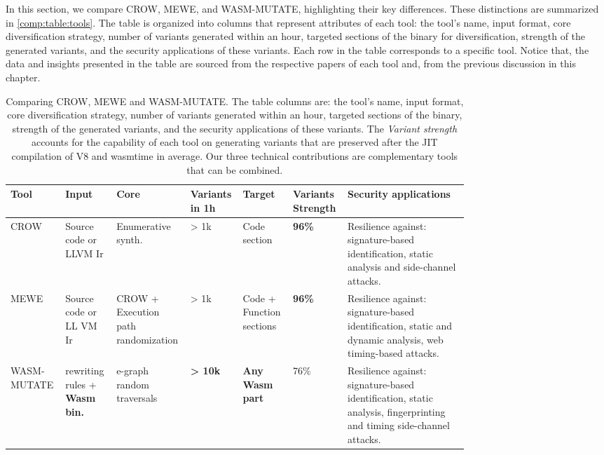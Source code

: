 

In this section, we compare CROW, MEWE, and WASM-MUTATE, highlighting their key differences. 
These distinctions are summarized in \autoref{comp:table:tools}. 
The table is organized into columns that represent attributes of each tool: the tool's name, input format, core diversification strategy, number of variants generated within an hour, targeted sections of the \Wasm binary for diversification, strength of the generated variants, and the security applications of these variants. 
Each row in the table corresponds to a specific tool. 
Notice that, the data and insights presented in the table are sourced from the respective papers of each tool and, from the previous discussion in this chapter.


\begin{landscape}
    
    \begin{table}
        \begin{tabular}{p{0.08\linewidth} | p{0.1\linewidth} | p{0.1\linewidth
            } | p{0.06\linewidth} | p{0.1\linewidth} | p{0.07\linewidth} | p{0.25\linewidth} } 
            Tool & Input & Core & Variants in 1h & Target  & Variants Strength & Security applications \\
            \hline \hline
            CROW & Source code or LLVM Ir & Enumerative synth. & > 1k & Code section  & \textbf{96\%} & Resilience against: signature-based identification, static analysis and side-channel attacks.  \\
            \hline
            MEWE & Source code or LL
            VM Ir & CROW + Execution path randomization  & > 1k & Code + Function sections  & \textbf{96\%} & Resilience against: signature-based identification, static and dynamic analysis, web timing-based attacks.  \\
            \hline
            WASM-MUTATE & rewriting rules + \textbf{Wasm bin.} & e-graph random traversals & \textbf{> 10k}  & \textbf{Any Wasm part}  & 76\% & Resilience against: signature-based identification, static analysis, fingerprinting and timing side-channel attacks. \\
            
        \end{tabular}
        \caption{Comparing CROW, MEWE and WASM-MUTATE. The table columns are: the tool's name, input format, core diversification strategy, number of variants generated within an hour, targeted sections of the \Wasm binary, strength of the generated variants, and the security applications of these variants. 
        The \emph{Variant strength} accounts for the capability of each tool on generating variants that are preserved after the JIT compilation of V8 and wasmtime in average.
        Our three technical contributions are complementary tools that can be combined.
        \label{comp:table:tools}}
    \end{table}
\end{landscape}

